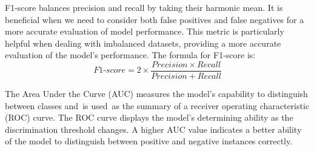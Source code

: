 F1-score balances precision and recall by taking their harmonic mean. It is beneficial when we need to consider both false positives and false negatives for a more accurate evaluation of model performance. This metric is particularly helpful when dealing with imbalanced datasets, providing a more accurate evaluation of the model's performance. The formula for F1-score is:
\begin{equation}
    F1\text{-}score = 2×\frac{Precision×Recall}{Precision+Recall}
\end{equation}

The Area Under the Curve (AUC) measures the model's capability to distinguish between classes and is used as the summary of a receiver operating characteristic (ROC) curve. The ROC curve displays the model's determining ability as the discrimination threshold changes. A higher AUC value indicates a better ability of the model to distinguish between positive and negative instances correctly.

